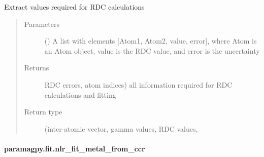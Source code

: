 \documentclass[a4paper,10pt,english,openany,oneside]{sphinxmanual}
\begin{document}
\begin{fulllineitems}
\label{\detokenize{reference/generated/paramagpy.fit.extract_rdc:paramagpy.fit.extract_rdc}}
Extract values required for RDC calculations
\begin{quote}\begin{description}
\item[{Parameters}] \leavevmode
{} () \textendash{} A list with elements {[}Atom1, Atom2, value, error{]}, where Atom is
an Atom object, value is the RDC value, and error is the uncertainty

\item[{Returns}] \leavevmode
{} \textendash{}         RDC errors, atom indices)
all information required for RDC calculations and fitting

\item[{Return type}] \leavevmode
(inter-atomic vector, gamma values, RDC values,

\end{description}\end{quote}

\end{fulllineitems}



\paragraph{paramagpy.fit.nlr\_fit\_metal\_from\_ccr}
\label{\detokenize{reference/generated/paramagpy.fit.nlr_fit_metal_from_ccr:paramagpy-fit-nlr-fit-metal-from-ccr}}\label{\detokenize{reference/generated/paramagpy.fit.nlr_fit_metal_from_ccr::doc}}
\end{document}
